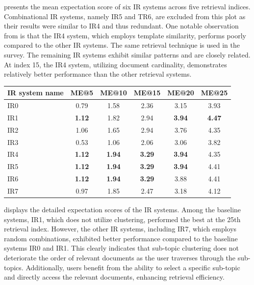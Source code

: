  presents the mean expectation score of six \ac{IR} systems across five retrieval indices. Combinational \ac{IR} systems, namely IR5 and TR6, are excluded from this plot as their results were similar to IR4 and thus redundant. One notable observation from  is that the IR4 system, which employs template similarity, performs poorly compared to the other IR systems. The same retrieval technique is used in the survey. The remaining \ac{IR} systems exhibit similar patterns and are closely related. At index 15, the IR4 system, utilizing document cardinality, demonstrates relatively better performance than the other retrieval systems.


\begin{center}
	\label{tab:mae_results}
	\begin{tabularx}{0.8\textwidth}{|Y|c|c|c|c|c|}
		\hline
		IR system name & ME@5 & ME@10 & ME@15 & ME@20 & ME@25 \\
\hline
IR0 &          0.79 &           1.58 &           2.36 &           3.15 &           3.93 \\ \hline 
IR1 &          \textbf{1.12} &           1.82 &           2.94 &          \textbf{3.94} &           \textbf{4.47} \\ \hline
IR2 &          1.06 &           1.65 &           2.94 &           3.76 &           4.35 \\ \hline
IR3 &          0.53 &           1.06 &           2.06 &           3.06 &           3.82 \\ \hline
IR4 &           \textbf{1.12}  &            \textbf{1.94}  &          \textbf{3.29} &           \textbf{3.94} &           4.35 \\ \hline
IR5 &           \textbf{1.12}  &           \textbf{1.94} &           \textbf{3.29} &       \textbf{3.94}&           4.41 \\ \hline
IR6 &          \textbf{1.12}  &           \textbf{1.94} &           \textbf{3.29} &           3.88 &           4.41 \\ \hline
IR7 &          0.97 &           1.85 &           2.47 &           3.18 &           4.12 \\ \hline
	\end{tabularx}
\end{center}

 displays the detailed expectation scores of the \ac{IR} systems. Among the baseline systems, IR1, which does not utilize clustering, performed the best at the 25th retrieval index. However, the other \ac{IR} systems, including IR7, which employs random combinations, exhibited better performance compared to the baseline systems IR0 and IR1. This clearly indicates that sub-topic clustering does not deteriorate the order of relevant documents as the user traverses through the sub-topics. Additionally, users benefit from the ability to select a specific sub-topic and directly access the relevant documents, enhancing retrieval efficiency.

